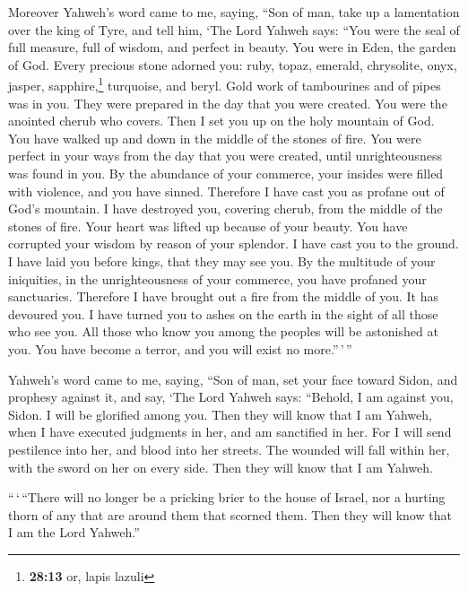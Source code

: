  Moreover Yahweh's word came to me, saying,
 ``Son of man, take up a lamentation over the king of
Tyre, and tell him, `The Lord Yahweh says: ``You were the seal of full
measure, full of wisdom, and perfect in beauty.  You were
in Eden, the garden of God. Every precious stone adorned you: ruby,
topaz, emerald, chrysolite, onyx, jasper, sapphire,\footnote{\textbf{28:13}
  or, lapis lazuli} turquoise, and beryl. Gold work of tambourines and
of pipes was in you. They were prepared in the day that you were
created.  You were the anointed cherub who covers. Then I
set you up on the holy mountain of God. You have walked up and down in
the middle of the stones of fire.  You were perfect in
your ways from the day that you were created, until unrighteousness was
found in you.  By the abundance of your commerce, your
insides were filled with violence, and you have sinned. Therefore I have
cast you as profane out of God's mountain. I have destroyed you,
covering cherub, from the middle of the stones of fire. 
Your heart was lifted up because of your beauty. You have corrupted your
wisdom by reason of your splendor. I have cast you to the ground. I have
laid you before kings, that they may see you.  By the
multitude of your iniquities, in the unrighteousness of your commerce,
you have profaned your sanctuaries. Therefore I have brought out a fire
from the middle of you. It has devoured you. I have turned you to ashes
on the earth in the sight of all those who see you.  All
those who know you among the peoples will be astonished at you. You have
become a terror, and you will exist no more.''\,'\,''

 Yahweh's word came to me, saying,  ``Son
of man, set your face toward Sidon, and prophesy against it,
 and say, `The Lord Yahweh says: ``Behold, I am against
you, Sidon. I will be glorified among you. Then they will know that I am
Yahweh, when I have executed judgments in her, and am sanctified in her.
 For I will send pestilence into her, and blood into her
streets. The wounded will fall within her, with the sword on her on
every side. Then they will know that I am Yahweh.

 ``\,`\,``There will no longer be a pricking brier to the
house of Israel, nor a hurting thorn of any that are around them that
scorned them. Then they will know that I am the Lord Yahweh.''

